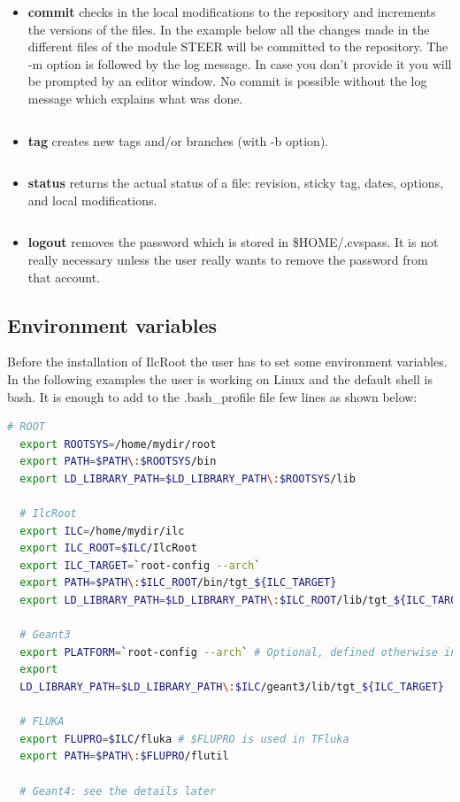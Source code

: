 \documentclass[12pt,a4paper,twoside]{article}
\begin{document}
\begin{itemize}
\item\textbf{commit}  checks   in  the  local   modifications  to  the
  repository and increments the versions  of the files. In the example
  below  all the changes  made in  the different  files of  the module
  STEER  will  be committed  to  the  repository.   The -m  option  is
  followed by the  log message. In case you don't  provide it you will
  be prompted by  an editor window. No commit  is possible without the
  log message which explains what was done.
  \begin{lstlisting}[language=sh]
    % cvs -qz9 commit -m ``Coding convention'' STEER
  \end{lstlisting}

\item\textbf{tag} creates new tags and/or branches (with -b option).
  \begin{lstlisting}[language=sh]
    % cvs tag -b v4-05-Release .
  \end{lstlisting}
\item\textbf{status} returns the actual status of a file: revision,
  sticky tag, dates, options, and local modifications.
  \begin{lstlisting}[language=sh]
    % cvs status Makefile
  \end{lstlisting}

\item\textbf{logout}   removes  the  password   which  is   stored  in
  \$HOME/.cvspass. It  is not really necessary unless  the user really
  wants to remove the password from that account.
\end{itemize}



\subsection{Environment variables}

Before  the  installation  of  IlcRoot   the  user  has  to  set  some
environment variables.  In the  following examples the user is working
on Linux  and the default shell  is bash. It  is enough to add  to the
.bash\_profile file few lines as shown below:

\begin{lstlisting}[language=sh]
  # ROOT
  export ROOTSYS=/home/mydir/root
  export PATH=$PATH\:$ROOTSYS/bin
  export LD_LIBRARY_PATH=$LD_LIBRARY_PATH\:$ROOTSYS/lib

  # IlcRoot
  export ILC=/home/mydir/ilc
  export ILC_ROOT=$ILC/IlcRoot
  export ILC_TARGET=`root-config --arch`
  export PATH=$PATH\:$ILC_ROOT/bin/tgt_${ILC_TARGET}
  export LD_LIBRARY_PATH=$LD_LIBRARY_PATH\:$ILC_ROOT/lib/tgt_${ILC_TARGET}

  # Geant3
  export PLATFORM=`root-config --arch` # Optional, defined otherwise in Geant3 Makefile
  export
  LD_LIBRARY_PATH=$LD_LIBRARY_PATH\:$ILC/geant3/lib/tgt_${ILC_TARGET}

  # FLUKA
  export FLUPRO=$ILC/fluka # $FLUPRO is used in TFluka
  export PATH=$PATH\:$FLUPRO/flutil

  # Geant4: see the details later
\end{lstlisting}
\end{document}
